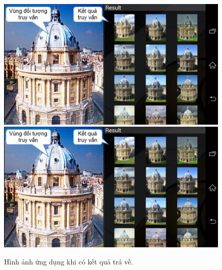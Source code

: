{\begin{figure}[!htbp]
  \begin{center}
    \leavevmode
    \ifpdf
      \includegraphics[scale=0.17]{interface_3}
    \else
      \includegraphics[scale=0.17]{interface_3}
    \fi
    \caption[Hình ảnh ứng dụng khi có kết quả trả về. Ứng dụng cho người dùng xem vùng đối tượng vừa được truy vấn cùng danh sách các hình ảnh thu nhỏ được trả về từ server.]{Hình ảnh ứng dụng khi có kết quả trả về.}
    \label{FigChooseRegion}
  \end{center}
\end{figure}

}
